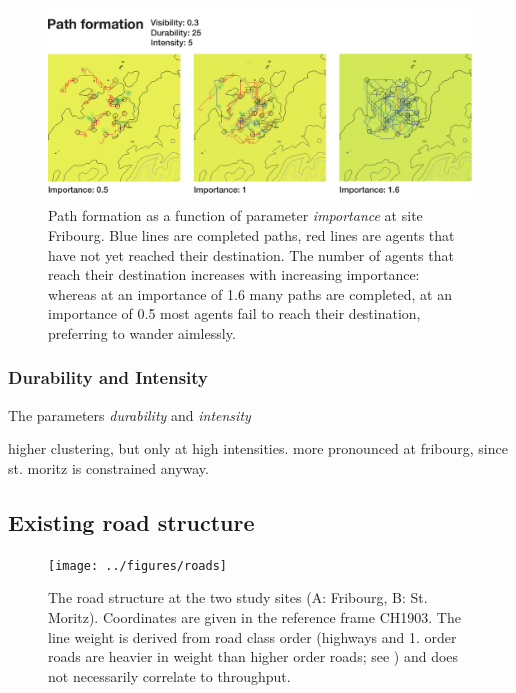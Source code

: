 \documentclass[a4paper, DIV11, abstracton]{scrartcl}
\begin{document}
\begin{figure}[tbp]
	\includegraphics[width=\linewidth]{../figures/importance}
	\caption{Path formation as a function of parameter \emph{importance} at site Fribourg. Blue lines are completed paths, red lines are agents that have not yet reached their destination. The number of agents that reach their destination increases with increasing importance: whereas at an importance of 1.6 many paths are completed, at an importance of 0.5 most agents fail to reach their destination, preferring to wander aimlessly.}
	\label{fig:importance}
\end{figure}


\subsubsection{Durability and Intensity}
The parameters \emph{durability} and \emph{intensity} 

higher clustering, but only at high intensities. more pronounced at fribourg, since st. moritz is constrained anyway.



\subsection{Existing road structure}
\label{sec:roads}

\begin{figure}[tbp]
	\texttt{[image: ../figures/roads]}
	\caption{The road structure at the two study sites (A: Fribourg, B: St. Moritz). Coordinates are given in the reference frame CH1903. The line weight is derived from road class order (highways and 1. order roads are heavier in weight than higher order roads; see \citet{vector25}) and does not necessarily correlate to throughput.}
	\label{fig:roads}
\end{figure}
\end{document}
